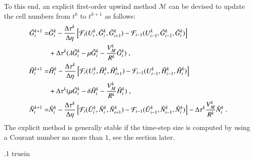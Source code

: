 \documentclass{amsart}
\theoremstyle{definition}
\theoremstyle{remark}
\numberwithin{equation}{section}
\numberwithin{figure}{section}
\begin{document}
To this end, an explicit first-order upwind method $\mathcal{M}$ can be devised to update the cell numbers from $t^k$ to $t^{k+1}$ as follows:
\begin{subequations}\label{eq:num_ex_upw_cell}
\begin{align}
\label{eq:num_ex_upw_cell_g}
\tilde{G}_i^{k+1} =& \tilde{G}_i^k - \frac{\Delta\tau^k}{\Delta\eta}\left[\mathcal{F}_i(U_i^k,\tilde{G}_i^k,\tilde{G}_{i+1}^k)-\mathcal{F}_{i-1}(U_{i-1}^k,\tilde{G}_{i-1}^k,\tilde{G}_i^k)\right] \\
\notag
    & + \Delta\tau^k(\lambda\tilde{G}_i^k-\mu\tilde{G}_i^k-\frac{V_M^k}{R^k}\tilde{G}_i^k)\;, \\
\label{eq:num_ex_upw_cell_h}
\tilde{H}_i^{k+1} =& \tilde{H}_i^k - \frac{\Delta\tau^k}{\Delta\eta}\left[\mathcal{F}_i(U_i^k,\tilde{H}_i^k,\tilde{H}_{i+1}^k)-\mathcal{F}_{i-1}(U_{i-1}^k,\tilde{H}_{i-1}^k,\tilde{H}_i^k)\right] \\
\notag
    & + \Delta\tau^k(\mu\tilde{G}_i^k-\delta\tilde{H}_i^k-\frac{V_M^k}{R^k}\tilde{H}_i^k)\;, \\
\label{eq:num_ex_upw_cell_n}
\tilde{N}_i^{k+1} =& \tilde{N}_i^k - \frac{\Delta\tau^k}{\Delta\eta}\left[\mathcal{F}_i(\check{U}_i^k,\tilde{N}_i^k,\tilde{N}_{i+1}^k)-\mathcal{F}_{i-1}(\check{U}_{i-1}^k,\tilde{N}_{i-1}^k,\tilde{N}_i^k)\right] - \Delta\tau^k\frac{V_M^k}{R^k}\tilde{N}_i^k\;.
\end{align}
\end{subequations}
The explicit method is generally stable if the time-step size is computed by using a Courant number no more than $1$, see the section later.

\vglue .1 truein
\end{document}
